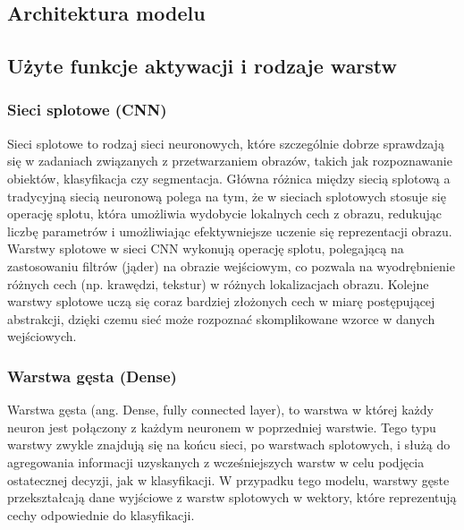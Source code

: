 \subsection{Architektura modelu}\label{subsec:architektura-modelu}

\subsection{Użyte funkcje aktywacji i rodzaje warstw}\label{subsec:uzyte-funkcje-aktywacji-i-rodzaje-warstw}

\subsubsection{Sieci splotowe (CNN)}
Sieci splotowe to rodzaj sieci neuronowych, które szczególnie dobrze sprawdzają się w zadaniach związanych
z przetwarzaniem obrazów, takich jak rozpoznawanie obiektów, klasyfikacja czy segmentacja.
Główna różnica między siecią splotową a tradycyjną siecią neuronową polega na tym,
że w sieciach splotowych stosuje się operację splotu, która umożliwia wydobycie lokalnych cech z obrazu,
redukując liczbę parametrów i umożliwiając efektywniejsze uczenie się reprezentacji obrazu. \\
Warstwy splotowe w sieci CNN wykonują operację splotu, polegającą na zastosowaniu filtrów (jąder) na obrazie wejściowym,
co pozwala na wyodrębnienie różnych cech (np. krawędzi, tekstur) w różnych lokalizacjach obrazu.
Kolejne warstwy splotowe uczą się coraz bardziej złożonych cech w miarę postępującej abstrakcji,
dzięki czemu sieć może rozpoznać skomplikowane wzorce w danych wejściowych.

\subsubsection{Warstwa gęsta (Dense)}
Warstwa gęsta (ang. Dense, fully connected layer), to warstwa w której każdy neuron jest połączony z każdym neuronem w poprzedniej warstwie.
Tego typu warstwy zwykle znajdują się na końcu sieci, po warstwach splotowych, i służą do agregowania informacji uzyskanych
z wcześniejszych warstw w celu podjęcia ostatecznej decyzji, jak w klasyfikacji.
W przypadku tego modelu, warstwy gęste przekształcają dane wyjściowe z warstw splotowych w wektory,
które reprezentują cechy odpowiednie do klasyfikacji.


